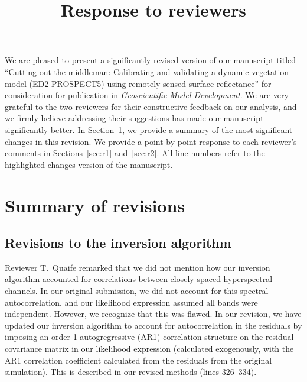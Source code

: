 \documentclass{article}
\title{Response to reviewers}
\author{}
\begin{document}
\maketitle

We are pleased to present a significantly revised version of our manuscript titled
``Cutting out the middleman: Calibrating and validating a dynamic vegetation model (ED2-PROSPECT5) using remotely sensed surface reflectance''
for consideration for publication in \emph{Geoscientific Model Development}.
We are very grateful to the two reviewers for their constructive feedback on our analysis, and we firmly believe addressing their suggestions has made our manuscript significantly better.
In Section~\ref{sec:summary}, we provide a summary of the most significant changes in this revision.
We provide a point-by-point response to each reviewer's comments in Sections~\ref{sec:r1} and~\ref{sec:r2}.
All line numbers refer to the highlighted changes version of the manuscript.

\section{Summary of revisions}\label{sec:summary}

\subsection{Revisions to the inversion algorithm}\label{subsec:algorithm}

Reviewer T.\ Quaife remarked that we did not mention how our inversion algorithm accounted for correlations between closely-spaced hyperspectral channels.
In our original submission, we did not account for this spectral autocorrelation, and our likelihood expression assumed all bands were independent.
However, we recognize that this was flawed.
In our revision, we have updated our inversion algorithm to account for autocorrelation in the residuals by imposing an order-1 autogregressive (AR1) correlation structure on the residual covariance matrix in our likelihood expression (calculated exogenously, with the AR1 correlation coefficient calculated from the residuals from the original simulation).
This is described in our revised methods (lines 326--334).
\end{document}
